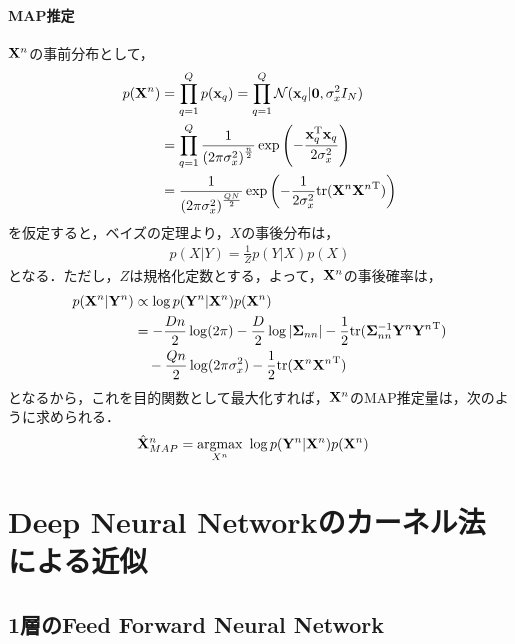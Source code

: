 \documentclass[11pt,a4j]{article}
\begin{document}
        \paragraph{MAP推定}
          ${\bf X}^n$の事前分布として，
          \begin{align}
            p({\bf X}^n) 
            &= \prod_{q=1}^{Q} p({\bf x}_q) = \prod_{q=1}^{Q} \mathcal{N}({\bf x}_q | {\bf 0}, \sigma_x^2 I_N) \\
            &= \prod_{q=1}^{Q} \frac{1}{{(2 \pi {\sigma_x^2} )}^{\frac{n}{2}}} \exp \left( - \frac{ {\bf x}_q^{\mathrm{T}} {\bf x}_q }{2 \sigma_x^2} \right) \\
            &= \frac{1}{{(2 \pi {\sigma_x^2} )}^{\frac{QN}{2}}} \exp \left( -\frac{1}{2 \sigma_x^2} {\rm tr} ({{\bf X}^n}{{\bf X}^n}^{\mathrm{T}}) \right) \\
          \end{align}
          を仮定すると，ベイズの定理より，$X$の事後分布は，
          \begin{align}
            p(X|Y) = \frac{1}{Z} p(Y|X)p(X)
          \end{align}
          となる．ただし，$Z$は規格化定数とする，よって，${\bf X}^n$の事後確率は，
          \begin{align}
            p({\bf X}^n|{\bf Y}^n) 
            &\propto \log p({\bf Y}^n | {\bf X}^n) p({\bf X}^n) \\
            &= -\frac{Dn}{2} \log (2 \pi) - \frac{D}{2} \log |{\bf \Sigma}_{nn}| - \frac{1}{2} {\rm tr} ({\bf \Sigma}_{nn}^{-1} {{\bf Y}^n}{{\bf Y}^n}^{\mathrm{T}}) \\
            &\hspace{1em} -\frac{Qn}{2} \log (2 \pi \sigma_x^2) - \frac{1}{2} {\rm tr} ({{\bf X}^n}{{\bf X}^n}^{\mathrm{T}})
          \end{align}
          となるから，これを目的関数として最大化すれば，${\bf X}^n$のMAP推定量は，次のように求められる．
          \begin{align}
            \hat{\bf X}^{n}_{MAP} &= \underset{X^n}{\rm argmax} ~ \log p({\bf Y}^n | {\bf X}^n) p({\bf X}^n) 
          \end{align}

  \section{Deep Neural Networkのカーネル法による近似}
    \subsection{1層のFeed Forward Neural Network}
\end{document}
